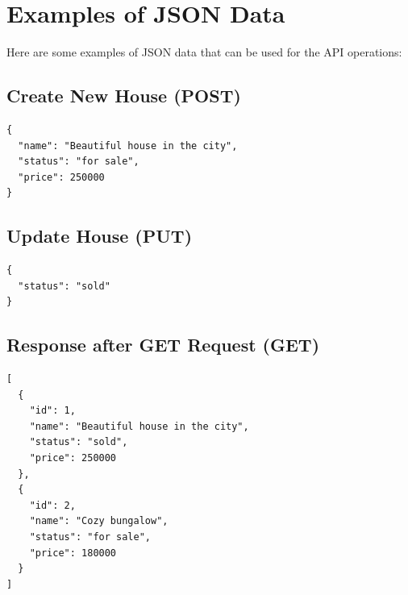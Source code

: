 \begin{oefening}
\begin{api}
\end{api}

\begin{api}
\end{api}

\begin{api}
\end{api}

\section{Examples of JSON Data}

Here are some examples of JSON data that can be used for the API operations:

\subsection{Create New House (POST)}

\begin{verbatim}
{
  "name": "Beautiful house in the city",
  "status": "for sale",
  "price": 250000
}
\end{verbatim}

\subsection{Update House (PUT)}

\begin{verbatim}
{
  "status": "sold"
}
\end{verbatim}

\subsection{Response after GET Request (GET)}

\begin{verbatim}
[
  {
    "id": 1,
    "name": "Beautiful house in the city",
    "status": "sold",
    "price": 250000
  },
  {
    "id": 2,
    "name": "Cozy bungalow",
    "status": "for sale",
    "price": 180000
  }
]
\end{verbatim}

\end{oefening}